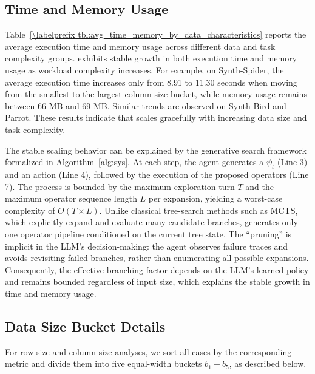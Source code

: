 \subsection{Time and Memory Usage}
\label{subsec:appendix_time_memory}



Table~\ref{\labelprefix tbl:avg_time_memory_by_data_characteristics} reports the average execution time and memory usage across different data and task complexity groups. \sys exhibits stable growth in both execution time and memory usage as workload complexity increases. For example, on Synth-Spider, the average execution time increases only from 8.91 to 11.30 seconds when moving from the smallest to the largest column-size bucket, while memory usage remains between 66 MB and 69 MB. Similar trends are observed on Synth-Bird and Parrot. These results indicate that \sys scales gracefully with increasing data size and task complexity.

The stable scaling behavior can be explained by the generative search framework formalized in Algorithm~\ref{alg:sys}. At each step, the agent generates a  $\psi_t$ (Line 3) and an  action (Line 4), followed by the execution of the proposed operators (Line 7). The process is bounded by the maximum exploration turn $T$ and the maximum operator sequence length $L$ per expansion, yielding a worst-case complexity of $O(T \times L)$. Unlike classical tree-search methods such as MCTS, which explicitly expand and evaluate many candidate branches, \sys generates only one operator pipeline conditioned on the current tree state. The ``pruning'' is implicit in the LLM's decision-making: the agent observes failure traces and avoids revisiting failed branches, rather than enumerating all possible expansions. Consequently, the effective branching factor depends on the LLM's learned policy and remains bounded regardless of input size, which explains the stable growth in time and memory usage.

\subsection{Data Size Bucket Details}
\label{subsec:appendix_bucket_details}

For row-size and column-size analyses, we sort all cases by the corresponding metric and divide them into five equal-width buckets $b_1 - b_5$, as described below.

